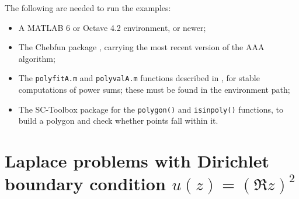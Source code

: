 \documentclass[final,a4paper,onecolumn,3p]{elsarticle}
\begin{document}
The following are needed to run the examples:
\begin{itemize}
	\item A MATLAB 6 or Octave 4.2 environment, or newer;
	\item The Chebfun package \cite{DHT14}, carrying the most recent version of the AAA algorithm;
	\item The \texttt{polyfitA.m} and \texttt{polyvalA.m} functions described in \cite{Tr19b}, for stable computations of power sums; these must be found in the environment path;
	\item The SC-Toolbox package \cite{SCTB} for the \texttt{polygon()} and \texttt{isinpoly()} functions, to build a polygon and check whether points fall within it.
\end{itemize}

\newpage
\section{Laplace problems with Dirichlet boundary condition $u(z)=(\Re z)^2$}
\end{document}
